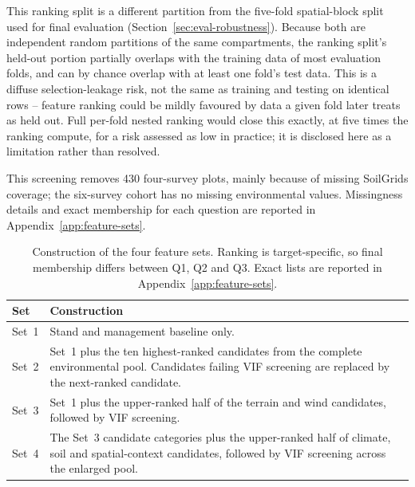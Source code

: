 This ranking split is a different partition from the five-fold spatial-block split used for final evaluation (Section~\ref{sec:eval-robustness}). Because both are independent random partitions of the same compartments, the ranking split's held-out portion partially overlaps with the training data of most evaluation folds, and can by chance overlap with at least one fold's test data. This is a diffuse selection-leakage risk, not the same as training and testing on identical rows -- feature ranking could be mildly favoured by data a given fold later treats as held out. Full per-fold nested ranking would close this exactly, at five times the ranking compute, for a risk assessed as low in practice; it is disclosed here as a limitation rather than resolved.

This screening removes 430 four-survey plots, mainly because of missing SoilGrids coverage; the six-survey cohort has no missing environmental values. Missingness details and exact membership for each question are reported in Appendix~\ref{app:feature-sets}.

\begin{table}[!htbp]
\centering
\scriptsize
\renewcommand{\arraystretch}{1.15}
\begin{tabularx}{\linewidth}{@{}p{1.4cm}X@{}}
\toprule
Set & Construction \\
\midrule

Set~1
& Stand and management baseline only. \\

Set~2
& Set~1 plus the ten highest-ranked candidates from the complete environmental pool. Candidates failing VIF screening are replaced by the next-ranked candidate. \\

Set~3
& Set~1 plus the upper-ranked half of the terrain and wind candidates, followed by VIF screening. \\

Set~4
& The Set~3 candidate categories plus the upper-ranked half of climate, soil and spatial-context candidates, followed by VIF screening across the enlarged pool. \\

\bottomrule
\end{tabularx}
\caption{Construction of the four feature sets. Ranking is target-specific, so final membership differs between Q1, Q2 and Q3. Exact lists are reported in Appendix~\ref{app:feature-sets}.}
\label{tab:feature-sets-construction}
\end{table}


